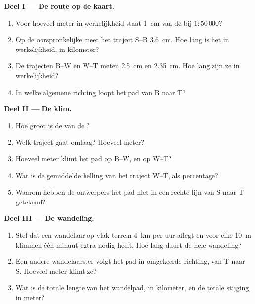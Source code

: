 \begin{problem}
\noindent\textbf{Deel I --- De route op de kaart.}\par\nopagebreak
\begin{enumerate}[beginpenalty=10000]
  \item Voor hoeveel meter in werkelijkheid staat \qty{1}{cm} van de 
        bij $1 : 50\,000$?
  \item Op de oorspronkelijke  meet het traject S--B \qty{3.6}{cm}. Hoe
        lang is het in werkelijkheid, in kilometer?
  \item De trajecten B--W en W--T meten \qty{2.5}{cm} en \qty{2.35}{cm}.
        Hoe lang zijn ze in werkelijkheid?
  \item In welke algemene richting loopt het pad van B naar T?
\end{enumerate}

\noindent\textbf{Deel II --- De klim.}\par\nopagebreak
\begin{enumerate}[resume, beginpenalty=10000]
  \item Hoe groot is de  van de ?
  \item Welk traject gaat omlaag? Hoeveel meter?
  \item Hoeveel meter klimt het pad op B--W, en op W--T?
  \item Wat is de gemiddelde helling van het traject W--T, als percentage?
  \item Waarom hebben de ontwerpers het pad niet in een rechte lijn van S
        naar T getekend?
\end{enumerate}

\noindent\textbf{Deel III --- De wandeling.}\par\nopagebreak
\begin{enumerate}[resume, beginpenalty=10000]
  \item Stel dat een wandelaar op vlak terrein \qty{4}{km} per uur aflegt
        en voor elke \qty{10}{m} klimmen één minuut extra nodig heeft. Hoe
        lang duurt de hele wandeling?
  \item Een andere wandelaarster volgt het pad in omgekeerde richting, van
        T naar S. Hoeveel meter klimt ze?
  \item Wat is de totale lengte van het wandelpad, in kilometer, en de
        totale stijging, in meter?
\end{enumerate}
\end{problem}
